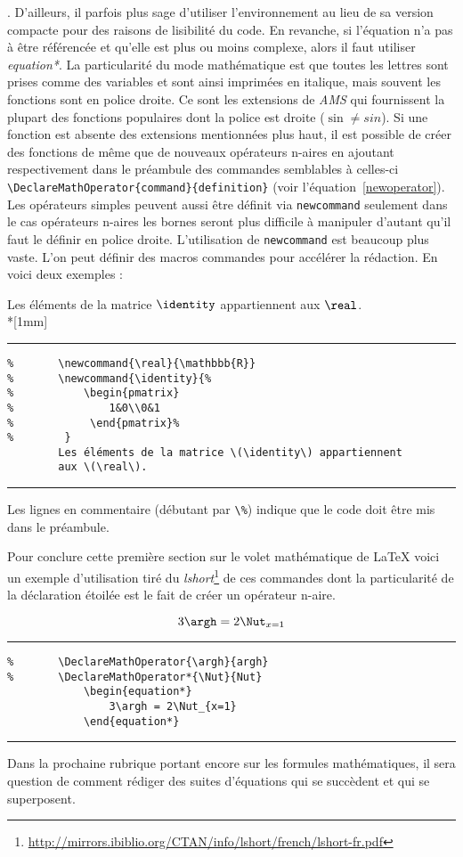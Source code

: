 	. D'ailleurs, il parfois plus sage d'utiliser l'environnement au lieu de sa version compacte pour des raisons de lisibilité du code. En revanche, si l'équation n'a pas à être référencée et qu'elle est plus ou moins complexe, alors il faut utiliser \textit{equation*}. La particularité du mode mathématique est que toutes les lettres sont prises comme des variables et sont ainsi imprimées en italique, mais souvent les fonctions sont en police droite. Ce sont les extensions de \textit{AMS} qui fournissent la plupart des fonctions populaires dont la police est droite ($\sin \neq sin$). %
	Si une fonction est absente des extensions mentionnées plus haut, il est possible de créer des fonctions de même que de nouveaux opérateurs n-aires en ajoutant respectivement dans le préambule des commandes semblables à celles-ci \verb|\DeclareMathOperator{command}{definition}| (voir l'équation~\ref{newoperator}). Les opérateurs simples peuvent aussi être définit via \verb|newcommand| seulement dans le cas opérateurs n-aires les bornes seront plus difficile à manipuler d'autant qu'il faut le définir en police droite. L'utilisation de \verb|newcommand| est beaucoup plus vaste. L'on peut définir des macros commandes pour accélérer la rédaction. En voici deux exemples :
	\begin{table}[H]
		Les éléments de la matrice \(\identity\) appartiennent aux \(\real\).\\*[1mm]
		\hrule
		\begin{verbatim}
%		\newcommand{\real}{\mathbbb{R}}
%		\newcommand{\identity}{%
%			\begin{pmatrix}
%			    1&0\\0&1
%			 \end{pmatrix}%
%		 }
		Les éléments de la matrice \(\identity\) appartiennent 
		aux \(\real\).
		\end{verbatim}
		\hrule
	\end{table}
	Les lignes en commentaire (débutant par \verb|\%|) indique que le code doit être mis dans le préambule.
%
	\par Pour conclure cette première section sur le volet mathématique de \LaTeX{} voici un exemple d'utilisation tiré du \textit{lshort}\footnote{\url{http://mirrors.ibiblio.org/CTAN/info/lshort/french/lshort-fr.pdf}} de ces commandes dont la particularité de la déclaration étoilée est le fait de créer un opérateur n-aire. 
%	
	\begin{table}[H]
		\begin{equation}\label{newoperator}
		3\argh = 2\Nut_{x=1}
		\end{equation}
		\hrule
		\begin{verbatim}
%		\DeclareMathOperator{\argh}{argh}
%		\DeclareMathOperator*{\Nut}{Nut}
			\begin{equation*}
			    3\argh = 2\Nut_{x=1}
			\end{equation*}
		\end{verbatim}
		\hrule
	\end{table}
%
Dans la prochaine rubrique portant encore sur les formules mathématiques, il sera question de comment rédiger des suites d'équations qui se succèdent et qui se superposent.